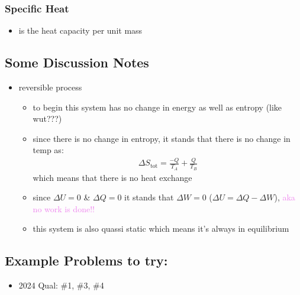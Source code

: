 \subsubsection{Specific Heat}
\begin{itemize}
    \item is the heat capacity per unit mass 
\end{itemize}


\subsection{Some Discussion Notes}
\begin{itemize}
	\item reversible process
	      \begin{itemize}
		      \item to begin this system has no change in energy as well as entropy (like wut???)
		      \item since there is no change in entropy, it stands that there is no change in temp as:
		            \begin{align}
			            \Delta S_\text{tot} = \frac{-Q}{T_A} + \frac{Q}{T_B}
		            \end{align}
		            which means that there is no heat exchange
		      \item since $\Delta U = 0$ \& $\Delta Q = 0$ it stands that $\Delta W = 0$
		            ($\Delta U = \Delta Q - \Delta W$), \textcolor{violet}{aka no work is done!!}
		      \item this system is also quassi static which means it's always in equilibrium
	      \end{itemize}
\end{itemize}


\subsection{Example Problems to try:}
\begin{itemize}
    \item 2024 Qual: \#1, \#3, \#4
\end{itemize}